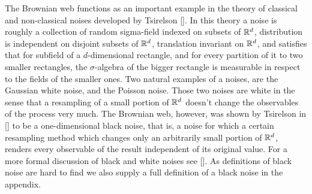 {The Brownian web functions as an important example in the theory of classical
and non-classical noises developed by Tsirelson []. In this theory a noise is
roughly a collection of random sigma-field indexed on subsets of $\mathbb{R}^d$,
distribution is independent on disjoint subsets of $\mathbb{R}^d$, translation
invariant on $\mathbb{R}^d$, and satisfies that for subfield of a $d$-dimensional
rectangle, and for every partition of it to two smaller rectangles, the $\sigma$-algebra
of the bigger rectangle is measurable in respect to the fields of the
smaller ones. Two natural examples of a noises, are the Gaussian white noise,
and the Poisson noise. Those two noises are white in the sense that a
resampling of a small portion of $\mathbb{R}^d$ doesn't change the observables of the
process very much. The Brownian web, however, was shown by Tsirelson in [] to
be a one-dimensional black noise, that is, a noise for which a certain
resampling method which changes only an arbitrarily small portion of $\mathbb{R}^d$,
renders every observable of the result independent of its original value. For
a more formal discussion of black and white noises see []. As definitions of
black noise are hard to find we also supply a full definition of a black
noise in the appendix.

}
